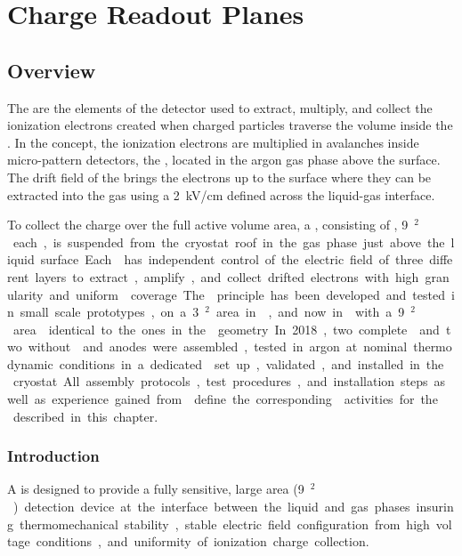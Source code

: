 \chapter{Charge Readout Planes}
\label{ch:dp-crp}
\section{Overview}
\label{ch:dp-crp-ov}

The  are the elements of the  detector used to extract, multiply, and collect the ionization electrons created when charged particles traverse the  volume inside the .
In the   concept, the ionization electrons are multiplied in avalanches inside micro-pattern detectors, the , located in the argon gas phase above the  surface. The drift field of the  brings the electrons up to the  surface where they can  be    extracted into the gas using a \SI{2}{kV/cm} \efield defined across the liquid-gas interface.

To collect the charge over the full  active volume area, a , consisting of \dptotcrp {}, \SI{9}{\m$^{2}$} each, is suspended from the cryostat roof in the gas phase just  above the liquid surface. Each  has independent control of the electric field of three different layers to extract, amplify, and collect drifted electrons with high granularity and uniform  coverage.
The  principle has been developed and tested in small scale prototypes, on a \SI{3}{\m$^{2}$} area in , and now in  with a \SI{9}{\m$^{2}$} area  identical to the ones in the  geometry.
In 2018, two complete  and two without  and anodes were assembled, tested in argon at nominal thermodynamic conditions in a dedicated \coldbox set up, validated, and installed in the  cryostat. All assembly protocols, test procedures, and installation steps as well as experience gained from  define the corresponding  activities for the   described in this chapter.

\subsection{Introduction}
\label{ch:dp-crp-intro}
A  is designed to provide a fully sensitive, large area (\SI{9}{\m$^{2}$}) detection device at the interface between the liquid and gas phases insuring thermomechanical stability, stable electric field configuration from high voltage conditions, and uniformity of ionization charge collection.   

